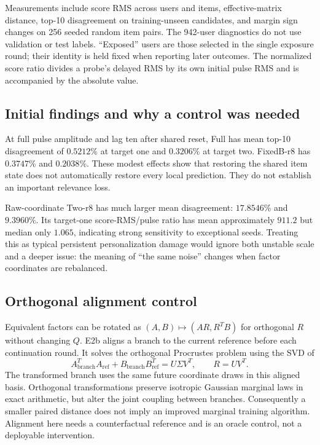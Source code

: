 Measurements include score RMS across users and items, effective-matrix
distance, top-10 disagreement on training-unseen candidates, and margin
sign changes on 256 seeded random item pairs. The 942-user diagnostics do
not use validation or test labels. ``Exposed'' users are those selected
in the single exposure round; their identity is held fixed when reporting
later outcomes. The normalized score ratio divides a probe's delayed RMS
by its own initial pulse RMS and is accompanied by the absolute value.

\subsection{Initial findings and why a control was needed}
At full pulse amplitude and lag ten after shared reset, Full has mean
top-10 disagreement of $0.5212$\% at target one and $0.3206$\% at target
two. FixedB-r8 has $0.3747$\% and $0.2038$\%. These modest effects show
that restoring the shared item state does not automatically restore every
local prediction. They do not establish an important relevance loss.

Raw-coordinate Two-r8 has much larger mean disagreement: $17.8546$\% and
$9.3960$\%. Its target-one score-RMS/pulse ratio has mean approximately
$911.2$ but median only $1.065$, indicating strong sensitivity to exceptional
seeds. Treating this as typical persistent personalization damage would
ignore both unstable scale and a deeper issue: the meaning of ``the same
noise'' changes when factor coordinates are rebalanced.

\subsection{Orthogonal alignment control}
Equivalent factors can be rotated as $(A,B)\mapsto(AR,R^TB)$ for orthogonal
$R$ without changing $Q$. E2b aligns a branch to the current reference before
each continuation round. It solves the orthogonal Procrustes problem using
the SVD of
\begin{equation}
 A_{\mathrm{branch}}^TA_{\mathrm{ref}}+
 B_{\mathrm{branch}}B_{\mathrm{ref}}^T=U\Sigma V^T,
 \qquad R=UV^T.
 \label{eq:alignment}
\end{equation}
The transformed branch uses the same future coordinate draws in this aligned
basis. Orthogonal transformations preserve isotropic Gaussian marginal laws
in exact arithmetic, but alter the joint coupling between branches.
Consequently a smaller paired distance does not imply an improved marginal
training algorithm. Alignment here needs a counterfactual reference and is
an oracle control, not a deployable intervention.

